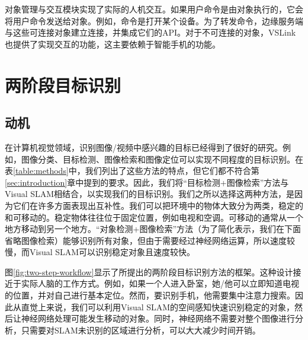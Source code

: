 对象管理与交互模块实现了实际的人机交互。如果用户命令是由对象执行的，它会将用户命令发送给对象。例如，命令是打开某个设备。为了转发命令，边缘服务端与这些可连接对象建立连接，并集成它们的API。对于不可连接的对象，VSLink也提供了实现交互的功能，这主要依赖于智能手机的功能。

\chapter{两阶段目标识别}\label{sec:fast}
\section{动机}\label{subsec:motivation}
在计算机视觉领域，识别图像/视频中感兴趣的目标已经得到了很好的研究。例如，图像分类\cite{he2019bag}、目标检测\cite{zou2019object}、图像检索\cite{philbin2008lost,zheng2017sift}和图像定位\cite{sattler2011fast}可以实现不同程度的目标识别。在表\ref{table:methods}中，我们列出了这些方法的特点，但它们都不符合第\ref{sec:introduction}章中提到的要求。因此，我们将“目标检测+图像检索”方法与Visual SLAM相结合，以实现我们的目标识别。我们之所以选择这两种方法，是因为它们在许多方面表现出互补性。我们可以把环境中的物体大致分为两类，稳定的和可移动的。稳定物体往往位于固定位置，例如电视和空调。可移动的通常从一个地方移动到另一个地方。“对象检测+图像检索”方法（为了简化表示，我们在下面省略图像检索）能够识别所有对象，但由于需要经过神经网络运算，所以速度较慢，而Visual SLAM可以识别稳定对象且速度较快。

图\ref{fig:two-step-workflow}显示了所提出的两阶段目标识别方法的框架。这种设计接近于实际人脑的工作方式。例如，如果一个人进入卧室，她/他可以立即知道电视的位置，并对自己进行基本定位。然而，要识别手机，他需要集中注意力搜索。因此从直觉上来说，我们可以利用Visual SLAM的空间感知快速识别稳定的对象，然后让神经网络处理可能发生移动的对象。同时，神经网络不需要对整个图像进行分析，只需要对SLAM未识别的区域进行分析，可以大大减少时间开销。


